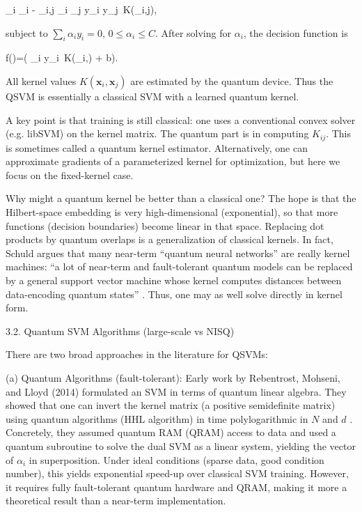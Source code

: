 \max{\alpha} \; \sum_i \alpha_i - \sum_{i,j} \alpha_i \alpha_j y_i y_j \,K(_i,j),

subject to $\sum_i \alpha_i y_i=0$, $0\le \alpha_i\le C$.  After solving for $\alpha_i$, the decision function is

f()=\Bigl( \alpha_i y_i \,K(_i,) + b\Bigr).

All kernel values $K(\mathbf{x}_i,\mathbf{x}_j)$ are estimated by the quantum device.  Thus the QSVM is essentially a classical SVM with a learned quantum kernel.



A key point is that training is still classical: one uses a conventional convex solver (e.g. libSVM) on the kernel matrix.  The quantum part is in computing $K_{ij}$.  This is sometimes called a quantum kernel estimator.  Alternatively, one can approximate gradients of a parameterized kernel for optimization, but here we focus on the fixed-kernel case.



Why might a quantum kernel be better than a classical one?  The hope is that the Hilbert-space embedding is very high-dimensional (exponential), so that more functions (decision boundaries) become linear in that space.  Replacing dot products by quantum overlaps is a generalization of classical kernels.  In fact, Schuld argues that many near-term “quantum neural networks” are really kernel machines: “a lot of near-term and fault-tolerant quantum models can be replaced by a general support vector machine whose kernel computes distances between data-encoding quantum states” .  Thus, one may as well solve directly in kernel form.





3.2. Quantum SVM Algorithms (large-scale vs NISQ)





There are two broad approaches in the literature for QSVMs:



(a) Quantum Algorithms (fault-tolerant): Early work by Rebentrost, Mohseni, and Lloyd (2014) formulated an SVM in terms of quantum linear algebra.  They showed that one can invert the kernel matrix (a positive semidefinite matrix) using quantum algorithms (HHL algorithm) in time polylogarithmic in $N$ and $d$ .  Concretely, they assumed quantum RAM (QRAM) access to data and used a quantum subroutine to solve the dual SVM as a linear system, yielding the vector of $\alpha_i$ in superposition.  Under ideal conditions (sparse data, good condition number), this yields exponential speed-up over classical SVM training.  However, it requires fully fault-tolerant quantum hardware and QRAM, making it more a theoretical result than a near-term implementation.



